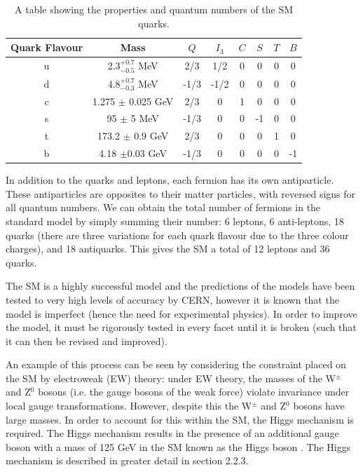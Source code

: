 \documentclass[12pt,a4paper,epsf,portrait,times,epsfig]{article}
\begin{document}
\begin{table}
	\begin{center}
		\begin{tabular}{ |c|c|c|c|c|c|c|c| }
			\hline \hline
			Quark Flavour & Mass & $Q$ & $I_{3}$ & $C$ & $S$ & $T$ & $B$ \\
			\hline
			u & 2.3$_{-0.5}^{+0.7}$ MeV & 2/3 & 1/2 & 0 & 0 & 0 & 0 \\
			\hline
			d & 4.8$_{-0.3}^{+0.7}$ MeV & -1/3 & -1/2 & 0 & 0 & 0 & 0 \\
			\hline
			c & 1.275 $\pm$ 0.025 GeV & 2/3 & 0 & 1 & 0 & 0 & 0 \\
			\hline
			s & 95 $\pm$ 5 MeV & -1/3 & 0 & 0 & -1 & 0 & 0 \\
			\hline
			t & 173.2 $\pm$ 0.9 GeV & 2/3 & 0 & 0 & 0 & 1 & 0 \\
			\hline 
			b & 4.18 $\pm 0.03$ GeV & -1/3 & 0& 0 & 0 & 0 & -1 \\
			\hline \hline
		\end{tabular}
			\caption{A table showing the properties and quantum numbers of the SM quarks\cite{Article:PDG}.}
			\label{tab:SMQuarks}
	\end{center}
\end{table}

In addition to the quarks and leptons, each fermion has its own antiparticle. These antiparticles are opposites to their matter particles, with reversed signs for all quantum numbers. We can obtain the total number of fermions in the standard model by simply summing their number: 6 leptons, 6 anti-leptons, 18 quarks (there are three variations for each quark flavour due to the three colour charges), and 18 antiquarks. This gives the SM a total of 12 leptons and 36 quarks. \par

The SM is a highly successful model and the predictions of the models have been tested to very high levels of accuracy by CERN, however it is known that the model is imperfect (hence the need for experimental physics). In order to improve the model, it must be rigorously tested in every facet until it is broken (such that it can then be revised and improved). \par

An example of this process can be seen by considering the constraint placed on the SM by electroweak (EW) theory: under EW theory, the masses of the W$^{\pm}$ and Z$^{0}$ bosons (i.e. the gauge bosons of the weak force) violate invariance under local gauge transformations. However, despite this the W$^{\pm}$ and Z$^{0}$ bosons have large masses. In order to account for this within the SM, the Higgs mechanism is required. The Higgs mechanism results in the presence of an additional gauge boson with a mass of 125 GeV in the SM known as the Higgs boson \cite{DiscoHiggsATLAS}\cite{DiscoHiggsCMS}. The Higgs mechanism is described in greater detail in section 2.2.3. \par
\end{document}
